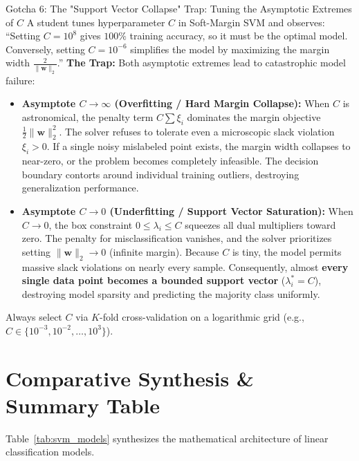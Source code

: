 \begin{trapbox}{Gotcha 6: The "Support Vector Collapse" Trap: Tuning the Asymptotic Extremes of $C$}
A student tunes hyperparameter $C$ in Soft-Margin SVM and observes: ``Setting $C = 10^8$ gives $100\%$ training accuracy, so it must be the optimal model. Conversely, setting $C = 10^{-6}$ simplifies the model by maximizing the margin width $\frac{2}{\|\mathbf{w}\|_2}$.''
\tcblower
\textbf{The Trap:} Both asymptotic extremes lead to catastrophic model failure:
\begin{itemize}
    \item \textbf{Asymptote $C \to \infty$ (Overfitting / Hard Margin Collapse):} When $C$ is astronomical, the penalty term $C \sum \xi_i$ dominates the margin objective $\frac{1}{2}\|\mathbf{w}\|_2^2$. The solver refuses to tolerate even a microscopic slack violation $\xi_i > 0$. If a single noisy mislabeled point exists, the margin width collapses to near-zero, or the problem becomes completely infeasible. The decision boundary contorts around individual training outliers, destroying generalization performance.
    \item \textbf{Asymptote $C \to 0$ (Underfitting / Support Vector Saturation):} When $C \to 0$, the box constraint $0 \le \lambda_i \le C$ squeezes all dual multipliers toward zero. The penalty for misclassification vanishes, and the solver prioritizes setting $\|\mathbf{w}\|_2 \to 0$ (infinite margin). Because $C$ is tiny, the model permits massive slack violations on nearly every sample. Consequently, almost \textbf{every single data point becomes a bounded support vector} ($\lambda_i^* = C$), destroying model sparsity and predicting the majority class uniformly.
\end{itemize}
Always select $C$ via $K$-fold cross-validation on a logarithmic grid (e.g., $C \in \{10^{-3}, 10^{-2}, \dots, 10^3\}$).
\end{trapbox}

\section{Comparative Synthesis \& Summary Table}

Table~\ref{tab:svm_models} synthesizes the mathematical architecture of linear classification models.

